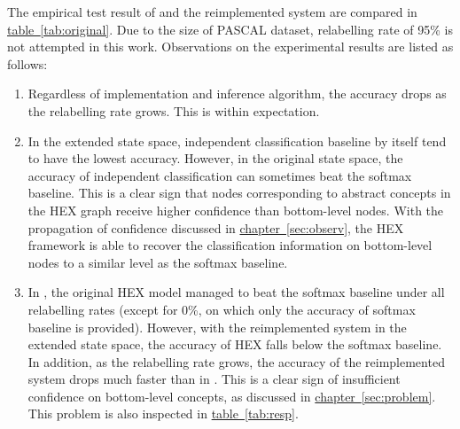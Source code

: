 \documentclass[11pt,a4paper]{book}
\begin{document}
The empirical test result of \cite{deng2014large} and the reimplemented system are compared in \hyperref[tab:original]{table~\ref{tab:original}}. Due to the size of PASCAL dataset, relabelling rate of 95\% is not attempted in this work. Observations on the experimental results are listed as follows:
\begin{enumerate}
\item Regardless of implementation and inference algorithm, the accuracy drops as the relabelling rate grows. This is within expectation.
\item In the extended state space, independent classification baseline by itself tend to have the lowest accuracy. However, in the original state space, the accuracy of independent classification can sometimes beat the softmax baseline. This is a clear sign that nodes corresponding to abstract concepts in the HEX graph receive higher confidence than bottom-level nodes. With the propagation of confidence discussed in \hyperref[sec:observ]{chapter~\ref{sec:observ}}, the HEX framework is able to recover the classification information on bottom-level nodes to a similar level as the softmax baseline.
\item In \cite{deng2014large}, the original HEX model managed to beat the softmax baseline under all relabelling rates (except for 0\%, on which only the accuracy of softmax baseline is provided). However, with the reimplemented system in the extended state space, the accuracy of HEX falls below the softmax baseline. In addition, as the relabelling rate grows, the accuracy of the reimplemented system drops much faster than in \cite{deng2014large}. This is a clear sign of insufficient confidence on bottom-level concepts, as discussed in \hyperref[sec:problem]{chapter~\ref{sec:problem}}. This problem is also inspected in \hyperref[tab:resp]{table~\ref{tab:resp}}.
\end{enumerate}
\end{document}
